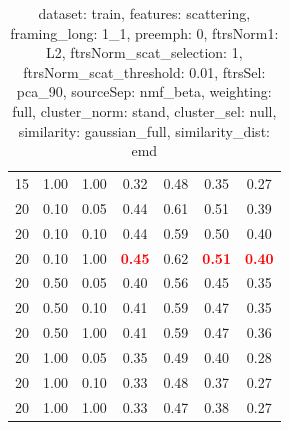 \begin{table}
\begin{center}
\begin{tabular}{lllcccc}
15 & 1.00 & 1.00 & 0.32 & 0.48 & 0.35 & 0.27 \\ 
20 & 0.10 & 0.05 & 0.44 & 0.61 & 0.51 & 0.39 \\ 
20 & 0.10 & 0.10 & 0.44 & 0.59 & 0.50 & 0.40 \\ 
20 & 0.10 & 1.00 & \textbf{\textcolor{red}{0.45}} & 0.62 & \textbf{\textcolor{red}{0.51}} & \textbf{\textcolor{red}{0.40}} \\ 
20 & 0.50 & 0.05 & 0.40 & 0.56 & 0.45 & 0.35 \\ 
20 & 0.50 & 0.10 & 0.41 & 0.59 & 0.47 & 0.35 \\ 
20 & 0.50 & 1.00 & 0.41 & 0.59 & 0.47 & 0.36 \\ 
20 & 1.00 & 0.05 & 0.35 & 0.49 & 0.40 & 0.28 \\ 
20 & 1.00 & 0.10 & 0.33 & 0.48 & 0.37 & 0.27 \\ 
20 & 1.00 & 1.00 & 0.33 & 0.47 & 0.38 & 0.27 \\ 
\end{tabular} 
\end{center} 
\caption{dataset: train, features: scattering, framing\_long: 1\_1, preemph: 0, ftrsNorm1: L2, ftrsNorm\_scat\_selection: 1, ftrsNorm\_scat\_threshold: 0.01, ftrsSel: pca\_90, sourceSep: nmf\_beta, weighting: full, cluster\_norm: stand, cluster\_sel: null, similarity: gaussian\_full, similarity\_dist: emd} 
\label{datasetrFeaturscFraminlong1_1Preemp0Ftrsnorm1L2Ftrsnoscatselect1Ftrsnoscatthresh0.01Ftrsselpc90SourcesepnmbeWeightfuClustenormstClusteselnuSimilagafuSimiladistem} 
\end{table} 
 

